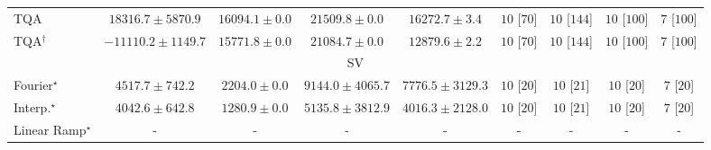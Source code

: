 \begin{tabular}{l|cccc|cccc|}
TQA & {\cellcolor[HTML]{B6E192}} \color[HTML]{000000} $18316.7\pm 5870.9$ & {\cellcolor[HTML]{C0E597}} \color[HTML]{000000} $16094.1\pm 0.0$ & {\cellcolor[HTML]{A7DB8C}} \color[HTML]{000000} $21509.8\pm 0.0$ & {\cellcolor[HTML]{BEE596}} \color[HTML]{000000} $16272.7\pm 3.4$ & {\cellcolor[HTML]{49006A}} \color[HTML]{F1F1F1} $10$ [$70$] & {\cellcolor[HTML]{49006A}} \color[HTML]{F1F1F1} $10$ [$144$] & {\cellcolor[HTML]{49006A}} \color[HTML]{F1F1F1} $10$ [$100$] & {\cellcolor[HTML]{CD238F}} \color[HTML]{F1F1F1} $7$ [$100$] \\
TQA$^\dagger$ & {\cellcolor[HTML]{FFFFE5}} \color[HTML]{000000} $-11110.2\pm 1149.7$ & {\cellcolor[HTML]{C1E698}} \color[HTML]{000000} $15771.8\pm 0.0$ & {\cellcolor[HTML]{ABDC8D}} \color[HTML]{000000} $21084.7\pm 0.0$ & {\cellcolor[HTML]{CCEA9D}} \color[HTML]{000000} $12879.6\pm 2.2$ & {\cellcolor[HTML]{49006A}} \color[HTML]{F1F1F1} $10$ [$70$] & {\cellcolor[HTML]{49006A}} \color[HTML]{F1F1F1} $10$ [$144$] & {\cellcolor[HTML]{49006A}} \color[HTML]{F1F1F1} $10$ [$100$] & {\cellcolor[HTML]{CD238F}} \color[HTML]{F1F1F1} $7$ [$100$] \\
\cline{1-9}
\multicolumn{9}{c}{\rule{0pt}{8pt}SV} \\
\midrule
Fourier$^\star$ & {\cellcolor[HTML]{97B7D7}} \color[HTML]{000000} $4517.7\pm 742.2$ & {\cellcolor[HTML]{EDE8F3}} \color[HTML]{000000} $2204.0\pm 0.0$ & {\cellcolor[HTML]{023858}} \color[HTML]{F1F1F1} $9144.0\pm 4065.7$ & {\cellcolor[HTML]{04629A}} \color[HTML]{F1F1F1} $7776.5\pm 3129.3$ & {\cellcolor[HTML]{49006A}} \color[HTML]{F1F1F1} $10$ [$20$] & {\cellcolor[HTML]{49006A}} \color[HTML]{F1F1F1} $10$ [$21$] & {\cellcolor[HTML]{49006A}} \color[HTML]{F1F1F1} $10$ [$20$] & {\cellcolor[HTML]{CD238F}} \color[HTML]{F1F1F1} $7$ [$20$] \\
Interp.$^\star$ & {\cellcolor[HTML]{AFC1DD}} \color[HTML]{000000} $4042.6\pm 642.8$ & {\cellcolor[HTML]{FFF7FB}} \color[HTML]{000000} $1280.9\pm 0.0$ & {\cellcolor[HTML]{78ABD0}} \color[HTML]{F1F1F1} $5135.8\pm 3812.9$ & {\cellcolor[HTML]{AFC1DD}} \color[HTML]{000000} $4016.3\pm 2128.0$ & {\cellcolor[HTML]{49006A}} \color[HTML]{F1F1F1} $10$ [$20$] & {\cellcolor[HTML]{49006A}} \color[HTML]{F1F1F1} $10$ [$21$] & {\cellcolor[HTML]{49006A}} \color[HTML]{F1F1F1} $10$ [$20$] & {\cellcolor[HTML]{CD238F}} \color[HTML]{F1F1F1} $7$ [$20$] \\
Linear Ramp$^\star$ & {\cellcolor[HTML]{000000}} \color[HTML]{F1F1F1} {\cellcolor{white}} \color{black} - & {\cellcolor[HTML]{000000}} \color[HTML]{F1F1F1} {\cellcolor{white}} \color{black} - & {\cellcolor[HTML]{000000}} \color[HTML]{F1F1F1} {\cellcolor{white}} \color{black} - & {\cellcolor[HTML]{000000}} \color[HTML]{F1F1F1} {\cellcolor{white}} \color{black} - & {\cellcolor[HTML]{000000}} \color[HTML]{F1F1F1} {\cellcolor{white}} \color{black} - & {\cellcolor[HTML]{000000}} \color[HTML]{F1F1F1} {\cellcolor{white}} \color{black} - & {\cellcolor[HTML]{000000}} \color[HTML]{F1F1F1} {\cellcolor{white}} \color{black} - & {\cellcolor[HTML]{000000}} \color[HTML]{F1F1F1} {\cellcolor{white}} \color{black} - \\

\end{tabular}
